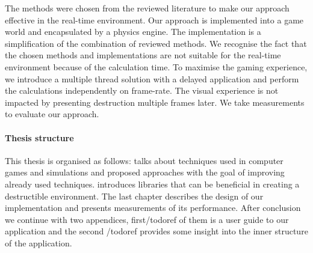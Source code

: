 The methods were chosen from the reviewed literature to make our approach effective in the real-time environment. Our approach is implemented into a game world and encapsulated by a physics engine. The implementation is a simplification of the combination of reviewed methods. We recognise the fact that the chosen methods and implementations are not suitable for the real-time environment because of the calculation time. To maximise the gaming experience, we introduce a multiple thread solution with a delayed application and perform the calculations independently on frame-rate. The visual experience is not impacted by presenting destruction multiple frames later. We take measurements to evaluate our approach.

\paragraph{Thesis structure}
This thesis is organised as follows:  talks about techniques used in computer games and simulations and proposed approaches with the goal of improving already used techniques.  introduces libraries that can be beneficial in creating a destructible environment. The last chapter describes the design of our implementation and presents measurements of its performance. After conclusion we continue with two appendices, first/todo{ref} of them is a user guide to our application and the second /todo{ref} provides some insight into the inner structure of the application. 

